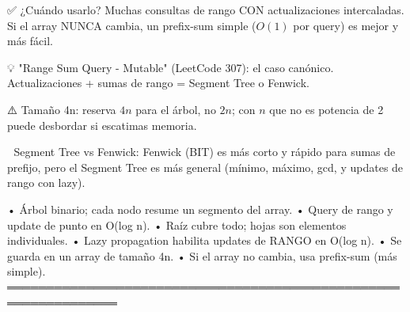 \begin{dsaentrevistas}

✅ ¿Cuándo usarlo? Muchas consultas de rango CON actualizaciones
   intercaladas. Si el array NUNCA cambia, un prefix-sum simple ($O(1)$
   por query) es mejor y más fácil.

💡 "Range Sum Query - Mutable" (LeetCode 307): el caso canónico.
   Actualizaciones + sumas de rango = Segment Tree o Fenwick.

⚠️ Tamaño 4n: reserva $4n$ para el árbol, no $2n$; con $n$ que no es
   potencia de 2 puede desbordar si escatimas memoria.

🔑 Segment Tree vs Fenwick: Fenwick (BIT) es más corto y rápido para
   sumas de prefijo, pero el Segment Tree es más general (mínimo, máximo,
   gcd, y updates de rango con lazy).

\end{dsaentrevistas}

\begin{dsaresumen}

• Árbol binario; cada nodo resume un segmento del array.
• Query de rango y update de punto en O(log n).
• Raíz cubre todo; hojas son elementos individuales.
• Lazy propagation habilita updates de RANGO en O(log n).
• Se guarda en un array de tamaño 4n.
• Si el array no cambia, usa prefix-sum (más simple).
════════════════════════════════════════════════════════════════

\end{dsaresumen}
